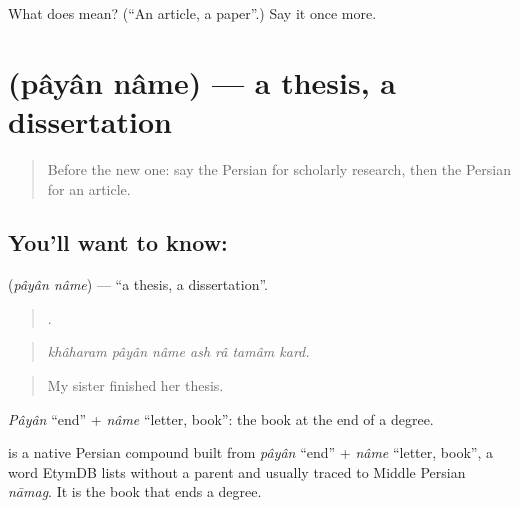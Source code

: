 \begin{tcolorbox}[breakable,colback=teal!4,colframe=teal!35!black,title={Before you move on}]
What does  mean? (\textquotedblleft{}An article, a paper\textquotedblright{}.) Say it once more.
\end{tcolorbox}
\section[\texorpdfstring{\fa{پایان} \fa{نامه} (pâyân nâme)}{پایان نامه (pâyân nâme)}]{  (pâyân nâme) — a thesis, a dissertation}

\label{lesson:FA-C402-payan-name}



\begin{quote}
Before the new one: say the Persian for scholarly research, then the Persian for an article.
\end{quote}

\subsection*{You'll want to know:  }
\textbf{ } (\emph{pâyân nâme}) — \textquotedblleft{}a thesis, a dissertation\textquotedblright{}.

\begin{quote}
      .
\end{quote}

\begin{quote}
\emph{khâharam pâyân nâme ash râ tamâm kard.}
\end{quote}

\begin{quote}
My sister finished her thesis.
\end{quote}

\emph{Pâyân} \textquotedblleft{}end\textquotedblright{} + \emph{nâme} \textquotedblleft{}letter, book\textquotedblright{}: the book at the end of a degree.

\begin{cousinweb}
\textbf{ } is a native Persian compound built from \emph{pâyân} \textquotedblleft{}end\textquotedblright{} + \emph{nâme} \textquotedblleft{}letter, book\textquotedblright{}, a word EtymDB lists without a parent and usually traced to Middle Persian \emph{nāmag}. It is the book that ends a degree.
\end{cousinweb}

